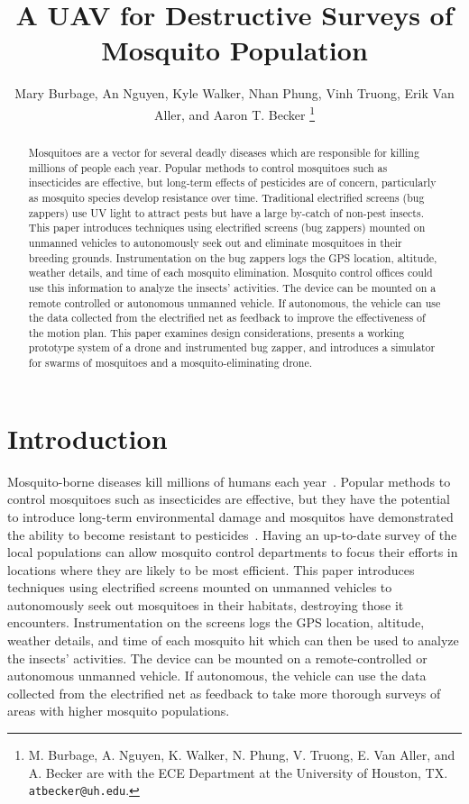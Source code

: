 \documentclass[letterpaper, 10 pt, conference]{ieeeconf}  %
\title{\LARGE \bf
A UAV for Destructive Surveys of Mosquito Population
}
\author{Mary Burbage, An Nguyen, Kyle Walker, Nhan Phung, Vinh Truong, Erik Van Aller, and Aaron T. Becker%
\thanks{M. Burbage, A. Nguyen, K. Walker, N. Phung, V. Truong, E. Van Aller, and A. Becker are with the ECE Department at the University of Houston, TX.
        {\tt\small atbecker@uh.edu}.}%
}
\begin{document}
\maketitle
\thispagestyle{empty}
\pagestyle{empty}


\begin{abstract}
Mosquitoes are a vector for several deadly diseases which are responsible for killing millions of people each year.  Popular methods to control mosquitoes such as insecticides are effective, but long-term effects of pesticides are of concern, particularly as mosquito species develop resistance over time.
Traditional electrified screens (bug zappers) use UV light to attract pests but have a large by-catch of non-pest insects. This paper introduces techniques using electrified screens (bug zappers) mounted on unmanned vehicles to autonomously seek out and eliminate mosquitoes in their breeding grounds. Instrumentation on the bug zappers logs the GPS location, altitude, weather details, and time of each mosquito elimination. Mosquito control offices could use this information to analyze the insects' activities. The device can be mounted on a remote controlled or autonomous unmanned vehicle. If autonomous, the vehicle can use the data collected from the electrified net as feedback to improve the effectiveness of the motion plan. 
This paper examines design considerations, presents a working prototype system of a drone and instrumented bug zapper, and introduces a simulator for swarms of mosquitoes and a mosquito-eliminating drone.  
\end{abstract}




\section{Introduction}


Mosquito-borne diseases kill millions of humans each year~\cite{murray2012global}. Popular methods to control mosquitoes such as insecticides are effective, but they have the potential to introduce long-term environmental damage and mosquitos have demonstrated the ability to become resistant to pesticides~\cite{ndiath2012resistance}. Having an up-to-date survey of the local populations can allow mosquito control departments to focus their efforts in locations where they are likely to be most efficient. This paper introduces techniques using electrified screens mounted on unmanned vehicles to autonomously seek out mosquitoes in their habitats, destroying those it encounters. Instrumentation on the screens logs the GPS location, altitude, weather details, and time of each mosquito hit which can then be used to analyze the insects' activities. The device can be mounted on a remote-controlled or autonomous unmanned vehicle. If autonomous, the vehicle can use the data collected from the electrified net as feedback to take more thorough surveys of areas with higher mosquito populations. 
\end{document}
